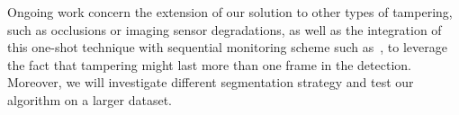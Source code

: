 \documentclass{llncs}
\begin{document}
Ongoing work concern the extension of our solution to other types of tampering, such as occlusions or imaging sensor degradations, as well as the integration of this one-shot technique with sequential monitoring scheme such as~\cite{alippi2010detecting}, to leverage the fact that tampering might last more than one frame in the detection. Moreover, we will investigate different segmentation strategy and test our algorithm on a larger dataset.








%	
%	
\end{document}
